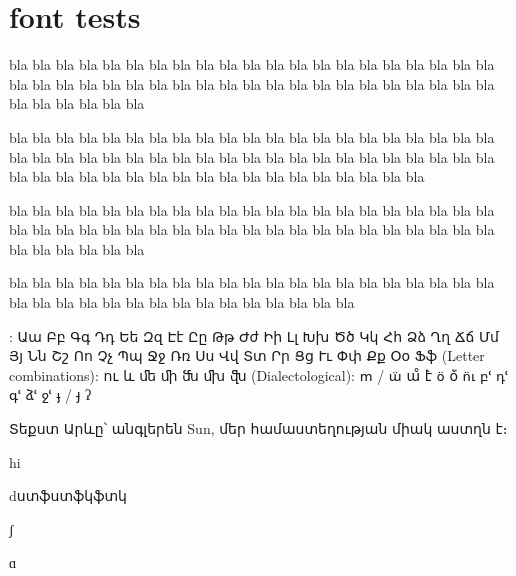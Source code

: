 \section{font tests}
bla bla bla bla bla bla bla bla bla bla bla bla
bla bla bla bla bla bla bla bla bla bla bla bla
bla bla bla bla bla bla bla bla bla bla bla bla
bla bla bla bla bla bla bla bla bla bla bla bla

bla bla bla bla bla bla bla bla bla bla bla bla
bla bla bla bla bla bla bla bla bla bla bla bla
bla bla bla bla bla bla bla bla bla bla bla bla
bla bla bla bla bla bla bla bla bla bla bla bla
bla bla bla bla bla bla bla bla bla bla bla bla


bla bla bla bla bla bla bla bla bla bla bla bla
bla bla bla bla bla bla bla bla bla bla bla bla
bla bla bla bla bla bla bla bla bla bla bla bla
bla bla bla bla bla bla bla bla bla bla bla bla

bla bla bla bla bla bla bla bla bla bla bla bla
bla bla bla bla bla bla bla bla bla bla bla bla
bla bla bla bla bla bla bla bla bla bla bla bla


: Աա   Բբ   Գգ   Դդ   Եե   Զզ   Էէ   Ըը   Թթ   Ժժ   Իի   Լլ   Խխ   Ծծ   Կկ   Հհ   Ձձ   Ղղ   Ճճ   Մմ   Յյ   Նն   Շշ   Ոո   Չչ   Պպ   Ջջ   Ռռ   Սս   Վվ   Տտ   Րր   Ցց   Ււ   Փփ   Քք   Օօ   Ֆֆ
(Letter combinations): ու   և   ﬔ   ﬕ   ﬓ   ﬗ   ﬖ
(Dialectological): 
ՠ / ա̈   ա̊   է̀   օ̈   օ̈̀   ո̈ւ   բՙ   դՙ   գՙ   ձՙ   ջՙ   ֈ / յ̵   ʔ 

Տեքստ Արևը՝ անգլերեն Sun, մեր համաստեղության միակ աստղն է։


hi

dստֆստֆկֆտկ

ʃ

ɑ
